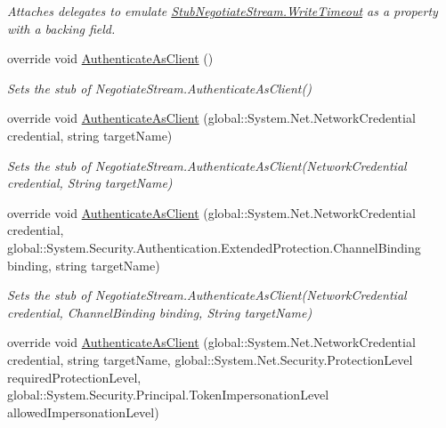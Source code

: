 \begin{DoxyCompactItemize}
\begin{DoxyCompactList}\small\item\em Attaches delegates to emulate \hyperlink{class_system_1_1_net_1_1_security_1_1_fakes_1_1_stub_negotiate_stream_aa053203616fa3e3aeeca63edccdef3cb}{Stub\-Negotiate\-Stream.\-Write\-Timeout} as a property with a backing field.\end{DoxyCompactList}\item 
override void \hyperlink{class_system_1_1_net_1_1_security_1_1_fakes_1_1_stub_negotiate_stream_a3f0dfb4c620fec7d31161439d4bf82df}{Authenticate\-As\-Client} ()
\begin{DoxyCompactList}\small\item\em Sets the stub of Negotiate\-Stream.\-Authenticate\-As\-Client()\end{DoxyCompactList}\item 
override void \hyperlink{class_system_1_1_net_1_1_security_1_1_fakes_1_1_stub_negotiate_stream_a281a6c5dc3e96c9cad10e0debb3b66b6}{Authenticate\-As\-Client} (global\-::\-System.\-Net.\-Network\-Credential credential, string target\-Name)
\begin{DoxyCompactList}\small\item\em Sets the stub of Negotiate\-Stream.\-Authenticate\-As\-Client(\-Network\-Credential credential, String target\-Name)\end{DoxyCompactList}\item 
override void \hyperlink{class_system_1_1_net_1_1_security_1_1_fakes_1_1_stub_negotiate_stream_af77cc5142fc94c90f9c147908f0cc5ff}{Authenticate\-As\-Client} (global\-::\-System.\-Net.\-Network\-Credential credential, global\-::\-System.\-Security.\-Authentication.\-Extended\-Protection.\-Channel\-Binding binding, string target\-Name)
\begin{DoxyCompactList}\small\item\em Sets the stub of Negotiate\-Stream.\-Authenticate\-As\-Client(\-Network\-Credential credential, Channel\-Binding binding, String target\-Name)\end{DoxyCompactList}\item 
override void \hyperlink{class_system_1_1_net_1_1_security_1_1_fakes_1_1_stub_negotiate_stream_a6ab0cfae79f2b59e7d26d9cfcae45426}{Authenticate\-As\-Client} (global\-::\-System.\-Net.\-Network\-Credential credential, string target\-Name, global\-::\-System.\-Net.\-Security.\-Protection\-Level required\-Protection\-Level, global\-::\-System.\-Security.\-Principal.\-Token\-Impersonation\-Level allowed\-Impersonation\-Level)

\end{DoxyCompactItemize}
